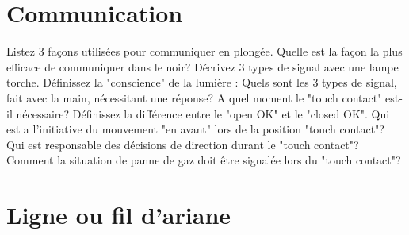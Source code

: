 \documentclass[english,1pt,a4paper]{article}
\begin{document}
	\section{Communication}

	\begin{outline}
		\1 Listez 3 façons utilisées pour communiquer en plongée.	\vspace{2cm}
		\1 Quelle est la façon la plus efficace de communiquer dans le noir?	\vspace{2cm}
		\1 Décrivez 3 types de signal avec une lampe torche.	\vspace{2cm}
		\1 Définissez la "conscience" de la lumière :	\vspace{2cm}
		\1 Quels sont les 3 types de signal, fait avec la main, nécessitant une réponse?	\vspace{2cm}
		\1 A quel moment le "touch contact" est-il nécessaire?	\vspace{2cm}
		\1 Définissez la différence entre le "open OK" et le "closed OK".	\vspace{2cm}
		\1 Qui est a l’initiative du mouvement "en avant" lors de la position "touch contact"?	\vspace{2cm}
		\1 Qui est responsable des décisions de direction durant le "touch contact"?	\vspace{2cm}
		\1 Comment la situation de panne de gaz doit être signalée lors du "touch contact"?	\vspace{2cm}
	\end{outline}
	\pagebreak	

	\section{Ligne ou fil d'ariane}
\end{document}
